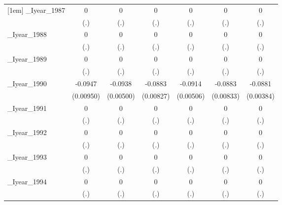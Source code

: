 \begin{table}[htbp]
\begin{tabular}{l*{6}{c}}
[1em]
\_Iyear\_1987&        0         &        0         &        0         &        0         &        0         &        0         \\
          &      (.)         &      (.)         &      (.)         &      (.)         &      (.)         &      (.)         \\
[1em]
\_Iyear\_1988&        0         &        0         &        0         &        0         &        0         &        0         \\
          &      (.)         &      (.)         &      (.)         &      (.)         &      (.)         &      (.)         \\
[1em]
\_Iyear\_1989&        0         &        0         &        0         &        0         &        0         &        0         \\
          &      (.)         &      (.)         &      (.)         &      (.)         &      (.)         &      (.)         \\
[1em]
\_Iyear\_1990&  -0.0947\sym{***}&  -0.0938\sym{***}&  -0.0883\sym{***}&  -0.0914\sym{***}&  -0.0883\sym{***}&  -0.0881\sym{***}\\
          &(0.00950)         &(0.00500)         &(0.00827)         &(0.00506)         &(0.00833)         &(0.00384)         \\
[1em]
\_Iyear\_1991&        0         &        0         &        0         &        0         &        0         &        0         \\
          &      (.)         &      (.)         &      (.)         &      (.)         &      (.)         &      (.)         \\
[1em]
\_Iyear\_1992&        0         &        0         &        0         &        0         &        0         &        0         \\
          &      (.)         &      (.)         &      (.)         &      (.)         &      (.)         &      (.)         \\
[1em]
\_Iyear\_1993&        0         &        0         &        0         &        0         &        0         &        0         \\
          &      (.)         &      (.)         &      (.)         &      (.)         &      (.)         &      (.)         \\
[1em]
\_Iyear\_1994&        0         &        0         &        0         &        0         &        0         &        0         \\
          &      (.)         &      (.)         &      (.)         &      (.)         &      (.)         &      (.)         \\

\end{tabular}
\end{table}
